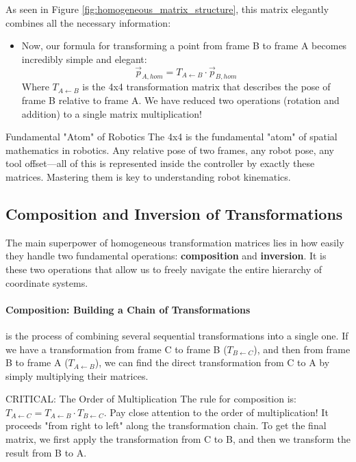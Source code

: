 As seen in Figure \ref{fig:homogeneous_matrix_structure}, this matrix elegantly combines all the necessary information:
\begin{itemize}
    \item Now, our formula for transforming a point from frame B to frame A becomes incredibly simple and elegant:
    $$ \vec{p}_{A, hom} = T_{A \leftarrow B} \cdot \vec{p}_{B, hom} $$
    Where $T_{A \leftarrow B}$ is the 4x4 transformation matrix that describes the pose of frame B relative to frame A. We have reduced two operations (rotation and addition) to a single matrix multiplication!
\end{itemize}

\begin{tipbox}{Fundamental "Atom" of Robotics}
The 4x4  is the fundamental "atom" of spatial mathematics in robotics. Any relative pose of two frames, any robot pose, any tool offset—all of this is represented inside the controller by exactly these matrices. Mastering them is key to understanding robot kinematics.
\end{tipbox}

\subsection{Composition and Inversion of Transformations}
The main superpower of homogeneous transformation matrices lies in how easily they handle two fundamental operations: \textbf{composition} and \textbf{inversion}. It is these two operations that allow us to freely navigate the entire hierarchy of coordinate systems.

\paragraph{Composition: Building a Chain of Transformations}
 is the process of combining several sequential transformations into a single one. If we have a transformation from frame C to frame B ($T_{B \leftarrow C}$), and then from frame B to frame A ($T_{A \leftarrow B}$), we can find the direct transformation from C to A by simply multiplying their matrices.

\begin{dangerbox}{CRITICAL: The Order of Multiplication}
The rule for composition is: $T_{A \leftarrow C} = T_{A \leftarrow B} \cdot T_{B \leftarrow C}$.
Pay close attention to the order of multiplication! It proceeds "from right to left" along the transformation chain. To get the final matrix, we first apply the transformation from C to B, and then we transform the result from B to A.
\end{dangerbox}

